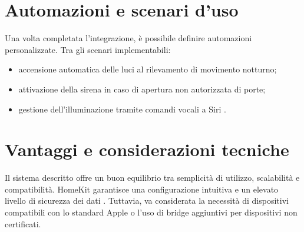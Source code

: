 \section{Automazioni e scenari d'uso}
Una volta completata l'integrazione, è possibile definire automazioni personalizzate. Tra gli scenari implementabili:
\begin{itemize}
    \item accensione automatica delle luci al rilevamento di movimento notturno;
    \item attivazione della sirena in caso di apertura non autorizzata di porte;
    \item gestione dell'illuminazione tramite comandi vocali a Siri \parencite{appleSiri}.
\end{itemize}

\section{Vantaggi e considerazioni tecniche}
Il sistema descritto offre un buon equilibrio tra semplicità di utilizzo, scalabilità e compatibilità. HomeKit garantisce una configurazione intuitiva e un elevato livello di sicurezza dei dati \parencite{applePrivacy}. Tuttavia, va considerata la necessità di dispositivi compatibili con lo standard Apple o l'uso di bridge aggiuntivi per dispositivi non certificati.


